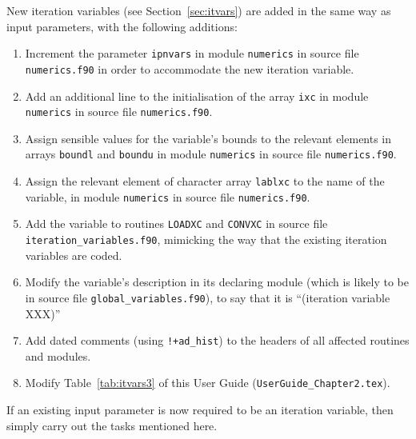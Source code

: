 New iteration variables (see Section~\ref{sec:itvars}) are added in the
same way as input parameters, with the following additions:

\begin{enumerate}

\item Increment the parameter \texttt{ipnvars} in module \texttt{numerics} in
  source file \texttt{numerics.f90} in order to accommodate the new iteration
  variable.

\item Add an additional line to the initialisation of the array \texttt{ixc}
  in module \texttt{numerics} in source file \texttt{numerics.f90}.

\item Assign sensible values for the variable's bounds to the relevant
  elements in arrays \texttt{boundl} and \texttt{boundu} in module
  \texttt{numerics} in source file \texttt{numerics.f90}.

\item Assign the relevant element of character array \texttt{lablxc} to the
  name of the variable, in module \texttt{numerics} in source file
  \texttt{numerics.f90}.

\item Add the variable to routines \texttt{LOADXC} and \texttt{CONVXC} in
  source file \texttt{iteration\_variables.f90}, mimicking the way that the
  existing iteration variables are coded.

\item Modify the variable's description in its declaring module (which is
  likely to be in source file \texttt{global\_variables.f90}), to say that it
  is ``(iteration variable XXX)''

\item Add dated comments (using \verb.!+ad_hist.) to the headers of
  all affected routines and modules.

\item Modify Table~\ref{tab:itvars3} of this User Guide
  (\texttt{UserGuide\_Chapter2.tex}).


\end{enumerate}

If an existing input parameter is now required to be an iteration variable,
then simply carry out the tasks mentioned here.


